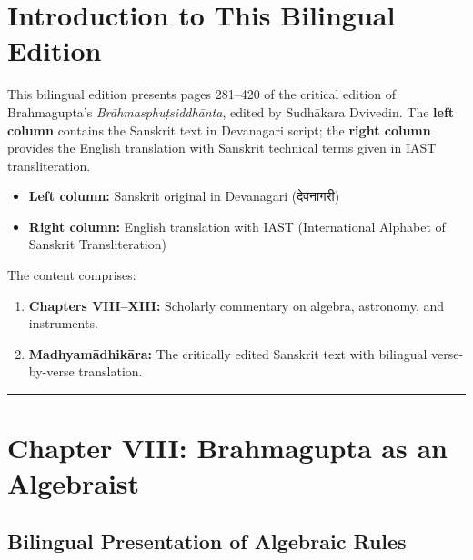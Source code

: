 \documentclass[11pt,a4paper]{article}
\newcommand{\longline}{\noindent\rule{\textwidth}{0.4pt}}
\newcommand{\dev}[1]{{\devanagarifont #1}}
\theoremstyle{definition}
\begin{document}
\tableofcontents
\newpage

\section*{Introduction to This Bilingual Edition}

This bilingual edition presents pages 281--420 of the critical edition of Brahmagupta's \textit{Br\=ahmasphu\d{t}siddh\=anta}, edited by Sudh\=akara Dvivedin. The \textbf{left column} contains the Sanskrit text in Devanagari script; the \textbf{right column} provides the English translation with Sanskrit technical terms given in IAST transliteration.

\begin{itemize}
  \item \textbf{Left column:} Sanskrit original in Devanagari (\dev{देवनागरी})
  \item \textbf{Right column:} English translation with IAST (International Alphabet of Sanskrit Transliteration)
\end{itemize}

The content comprises:
\begin{enumerate}
  \item \textbf{Chapters VIII--XIII:} Scholarly commentary on algebra, astronomy, and instruments.
  \item \textbf{Madhyam\=adhik\=ara:} The critically edited Sanskrit text with bilingual verse-by-verse translation.
\end{enumerate}

\longline

\section{Chapter VIII: Brahmagupta as an Algebraist}
\label{sec:algebraist}

\subsection*{Bilingual Presentation of Algebraic Rules}
\end{document}
